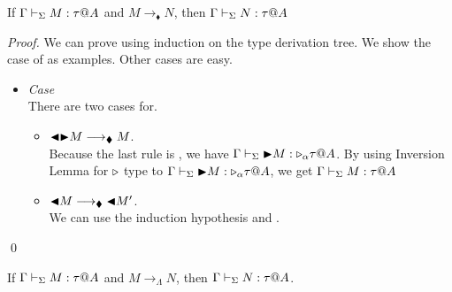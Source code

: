 \begin{theorem}
	If $\G\V M:\tau@A$ and $M\longrightarrow_\blacklozenge N$, then $\G\V N:\tau@A$\\
\end{theorem}
	
\begin{proof}
	We can prove using induction on the type derivation tree.
	We show the case of \TTBL{} as examples.
	Other cases are easy.
	\begin{itemize}
		\newcommand{\R}{\longrightarrow_{\blacklozenge}}
																	
		\item \textit{Case} \TTBL{}\\
		      There are two cases for.
		      \begin{itemize}
		      	\item $\TBL\TB M \R M$.\\
		      	      Because the last rule is \TTBL, we have $\Gamma \vdash_\Sigma {\mathop{\blacktriangleright}} M : {\mathop{\triangleright}}_\alpha \tau @A$.
		      	      By using Inversion Lemma for ${\mathop{\triangleright}}$ type to $\Gamma \vdash_\Sigma {\mathop{\blacktriangleright}} M : {\mathop{\triangleright}}_\alpha \tau @A$,
		      	      we get $\Gamma \vdash_\Sigma M : \tau @A$
		      	\item $\TBL M \R \TBL M'$.\\
		      	      We can use the induction hypothesis and \TTBL.
		      \end{itemize}
	\end{itemize}
\qed\end{proof}

\begin{theorem}
	If $\G\V M:\tau@A$ and $M \longrightarrow_{\Lambda} N$, then $\G\V N:\tau@A$.
\end{theorem}
	
